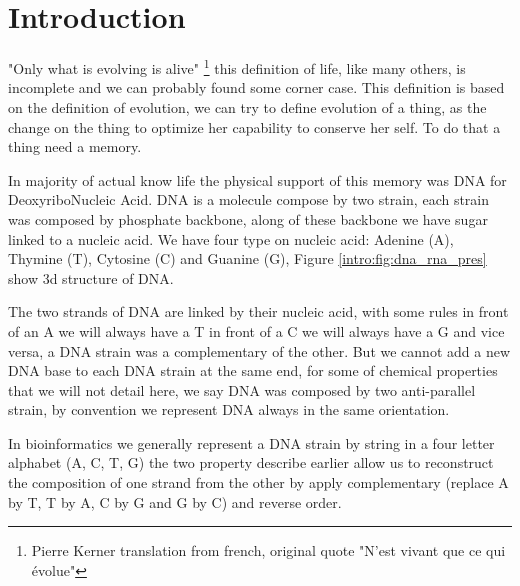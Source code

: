 \documentclass[./main.tex]{subfiles}
\begin{document}
\chapter{Introduction}\label{chapter:introduction}

"Only what is evolving is alive" \footnote{Pierre Kerner translation from french, original quote "N'est vivant que ce qui évolue"} this definition of life, like many others, is incomplete and we can probably found some corner case. This definition is based on the definition of evolution, we can try to define evolution of a thing, as the change on the thing to optimize her capability to conserve her self. To do that a thing need a memory.

In majority of actual know life the physical support of this memory was DNA for DeoxyriboNucleic Acid. DNA is a molecule compose by two strain, each strain was composed by phosphate backbone, along of these backbone we have sugar linked to a nucleic acid. We have four type on nucleic acid: Adenine (A), Thymine (T), Cytosine (C) and Guanine (G), Figure \ref{intro:fig:dna_rna_pres} show 3d structure of DNA.

The two strands of DNA are linked by their nucleic acid, with some rules in front of an A we will always have a T in front of a C we will always have a G and vice versa, a DNA strain was a complementary of the other. But we cannot add a new DNA base to each DNA strain at the same end, for some of chemical properties that we will not detail here, we say DNA was composed by two anti-parallel strain, by convention we represent DNA always in the same orientation.

In bioinformatics we generally represent a DNA strain by string in a four letter alphabet (A, C, T, G) the two property describe earlier allow us to reconstruct the composition of one strand from the other by apply complementary (replace A by T, T by A, C by G and G by C) and reverse order.
\end{document}
